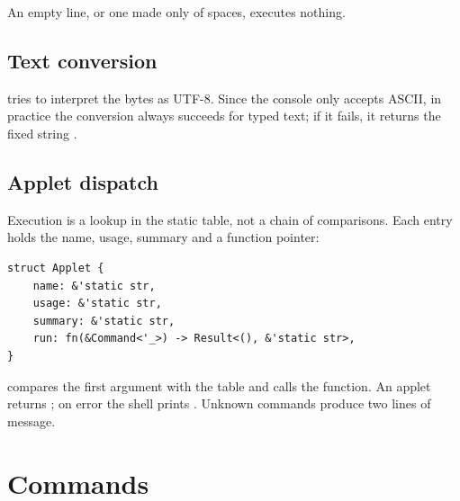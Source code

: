 An empty line, or one made only of spaces, executes nothing.

\subsection{Text conversion}

 tries to interpret the bytes as UTF-8. Since the console only
accepts ASCII, in practice the conversion always succeeds for typed text; if
it fails, it returns the fixed string .

\subsection{Applet dispatch}

Execution is a lookup in the static  table, not a chain of
comparisons. Each entry holds the name, usage, summary and a function pointer:

\begin{lstlisting}[caption={Applet table entry.},label={lst:applet}]
struct Applet {
    name: &'static str,
    usage: &'static str,
    summary: &'static str,
    run: fn(&Command<'_>) -> Result<(), &'static str>,
}
\end{lstlisting}

 compares the first argument with the table and
 calls the function. An applet returns ; on error
the shell prints . Unknown commands produce two lines of
message.

\section{Commands}

